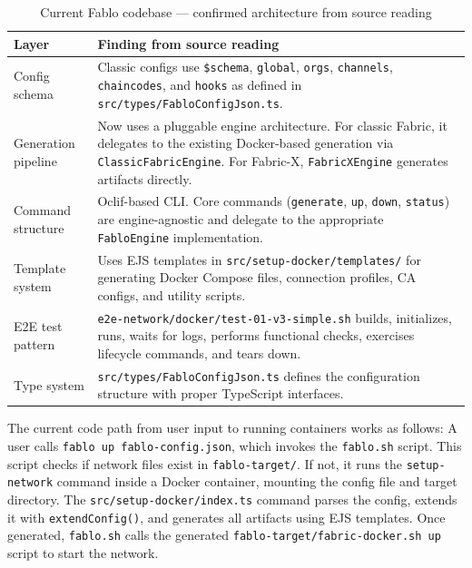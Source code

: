 \begin{table}[h]
\centering
\begin{tabularx}{\textwidth}{|l|X|}
\hline
\textbf{Layer} & \textbf{Finding from source reading} \\
\hline
Config schema & Classic configs use \texttt{\$schema}, \texttt{global}, \texttt{orgs}, \texttt{channels}, \texttt{chaincodes}, and \texttt{hooks} as defined in \texttt{src/types/FabloConfigJson.ts}. \\
\hline
Generation pipeline & Now uses a pluggable engine architecture. For classic Fabric, it delegates to the existing Docker-based generation via \texttt{ClassicFabricEngine}. For Fabric-X, \texttt{FabricXEngine} generates artifacts directly. \\
\hline
Command structure & Oclif-based CLI. Core commands (\texttt{generate}, \texttt{up}, \texttt{down}, \texttt{status}) are engine-agnostic and delegate to the appropriate \texttt{FabloEngine} implementation. \\
\hline
Template system & Uses EJS templates in \texttt{src/setup-docker/templates/} for generating Docker Compose files, connection profiles, CA configs, and utility scripts. \\
\hline
E2E test pattern & \texttt{e2e-network/docker/test-01-v3-simple.sh} builds, initializes, runs, waits for logs, performs functional checks, exercises lifecycle commands, and tears down. \\
\hline
Type system & \texttt{src/types/FabloConfigJson.ts} defines the configuration structure with proper TypeScript interfaces. \\
\hline
\end{tabularx}
\caption{Current Fablo codebase --- confirmed architecture from source reading}
\label{tab:fablo-analysis}
\end{table}

The current code path from user input to running containers works as follows: A user calls \texttt{fablo up fablo-config.json}, which invokes the \texttt{fablo.sh} script. This script checks if network files exist in \texttt{fablo-target/}. If not, it runs the \texttt{setup-network} command inside a Docker container, mounting the config file and target directory. The \texttt{src/setup-docker/index.ts} command parses the config, extends it with \texttt{extendConfig()}, and generates all artifacts using EJS templates. Once generated, \texttt{fablo.sh} calls the generated \texttt{fablo-target/fabric-docker.sh up} script to start the network.

